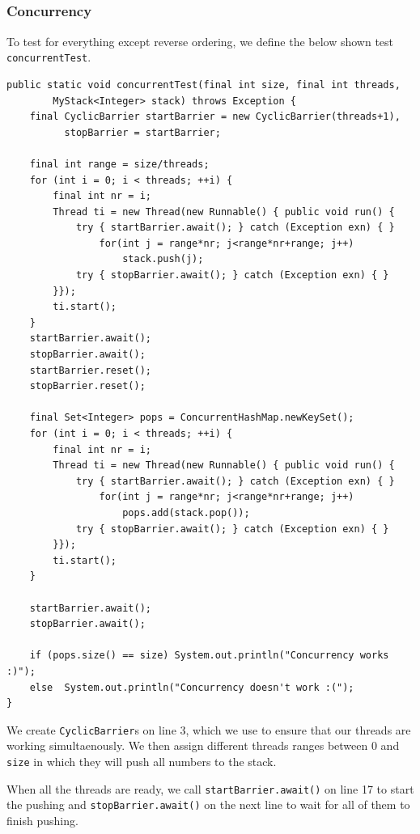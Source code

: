\documentclass[a5paper]{article}
\begin{document}
\subsection{}
\subsubsection{Concurrency}
To test for everything except reverse ordering, we define the below shown test \texttt{concurrentTest}.
\begin{lstlisting}
public static void concurrentTest(final int size, final int threads,  
        MyStack<Integer> stack) throws Exception {
    final CyclicBarrier startBarrier = new CyclicBarrier(threads+1), 
          stopBarrier = startBarrier;

    final int range = size/threads;
    for (int i = 0; i < threads; ++i) {
        final int nr = i;
        Thread ti = new Thread(new Runnable() { public void run() {
            try { startBarrier.await(); } catch (Exception exn) { }
                for(int j = range*nr; j<range*nr+range; j++)
                    stack.push(j);
            try { stopBarrier.await(); } catch (Exception exn) { }
        }});
        ti.start();
    }
    startBarrier.await();
    stopBarrier.await();
    startBarrier.reset();
    stopBarrier.reset();

    final Set<Integer> pops = ConcurrentHashMap.newKeySet();
    for (int i = 0; i < threads; ++i) {
        final int nr = i;
        Thread ti = new Thread(new Runnable() { public void run() {
            try { startBarrier.await(); } catch (Exception exn) { }
                for(int j = range*nr; j<range*nr+range; j++)
                    pops.add(stack.pop());
            try { stopBarrier.await(); } catch (Exception exn) { }
        }});
        ti.start();
    }

    startBarrier.await();
    stopBarrier.await();

    if (pops.size() == size) System.out.println("Concurrency works :)");
    else  System.out.println("Concurrency doesn't work :(");
}
\end{lstlisting}

We create \texttt{CyclicBarrier}s on line 3, which we use to ensure that our threads are working simultaenously. 
We then assign different threads ranges between 0 and \texttt{size} in which they will push all numbers to the stack.

When all the threads are ready, we call \texttt{startBarrier.await()} on line 17 to start the pushing and \texttt{stopBarrier.await()} on the next line
to wait for all of them to finish pushing. 
\end{document}
